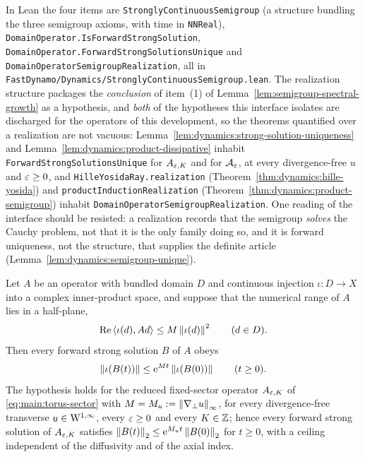 In Lean the four items are \texttt{StronglyContinuousSemigroup} (a structure bundling the
three semigroup axioms, with time in \texttt{NNReal}),
\texttt{DomainOperator.IsForwardStrongSolution},
\texttt{DomainOperator.ForwardStrongSolutionsUnique} and
\texttt{DomainOperatorSemigroupRealization}, all in
\texttt{FastDynamo/Dynamics/StronglyContinuousSemigroup.lean}.  The realization structure
packages the \emph{conclusion} of item~(1) of Lemma~\ref{lem:semigroup-spectral-growth} as a
hypothesis, and \emph{both} of the hypotheses this interface isolates are discharged for
the operators of this development, so the theorems quantified over a realization are not
vacuous:
Lemma~\ref{lem:dynamics:strong-solution-uniqueness} and
Lemma~\ref{lem:dynamics:product-dissipative} inhabit
\texttt{ForwardStrongSolutionsUnique} for $A_{\varepsilon,K} $ and for
$\mathcal A_\varepsilon $, at every divergence-free $u $ and $\varepsilon\geq0 $, and \texttt{HilleYosidaRay.realization}
(Theorem~\ref{thm:dynamics:hille-yosida}) and
\texttt{productInductionRealization} (Theorem~\ref{thm:dynamics:product-semigroup})
inhabit \texttt{DomainOperatorSemigroupRealization}.  One reading of the interface should
be resisted: a realization records that the semigroup \emph{solves} the Cauchy
problem, not that it is the only family doing so, and it is forward uniqueness, not the
structure, that supplies the definite article
(Lemma~\ref{lem:dynamics:semigroup-unique}).

\begin{lemma}
  \label{lem:dynamics:energy-bound}
  \leanok
  Let $A $ be an operator with bundled domain $D $ and continuous injection $\iota:D\to X $
  into a complex inner-product space, and suppose that the numerical range of $A $ lies in
  a half-plane,
  \[
    \operatorname{Re}\left\langle\iota(d),A d\right\rangle\leq M\left\|\iota(d)\right\|^2
    \qquad(d\in D).
  \]
  Then every forward strong solution $B $ of $A $ obeys
  \[
    \left\|\iota(B(t))\right\|\leq\mathrm{e}^{Mt}\left\|\iota(B(0))\right\|
    \qquad(t\geq0).
  \]
  The hypothesis holds for the reduced fixed-sector operator $A_{\varepsilon,K} $ of
  \eqref{eq:main:torus-sector} with $M=M_u:=\left\|\nabla_\perp u\right\|_\infty $, for every
  divergence-free transverse $u\in\mathrm{W}^{1,\infty} $, every $\varepsilon\geq0 $ and every $K\in\mathbb{Z} $;
  hence every forward strong solution of $A_{\varepsilon,K} $ satisfies
  $\left\|B(t)\right\|_2\leq\mathrm{e}^{M_ut}\left\|B(0)\right\|_2 $ for $t\geq0 $, with a ceiling independent of
  the diffusivity and of the axial index.
\end{lemma}

